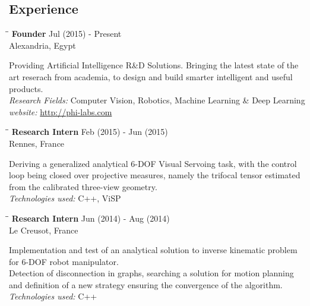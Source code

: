 \documentclass{res}
\begin{document}
\begin{resume}
\section{Experience}
   \vspace{-0.1in}
   \begin{tabbing}
   \hspace{2.7in}\= \hspace{1.8in}\= \kill %
   {\bf Founder}\> \hfill Jul (2015) - Present\\
                                    \>Alexandria, Egypt
   \end{tabbing}\vspace{-20pt}      %
    Providing Artificial Intelligence R\&D Solutions. Bringing the latest state of the art reserach from academia, to design and build smarter intelligent and useful products.\\
    {\sl Research Fields:}  Computer Vision, Robotics, Machine Learning \& Deep Learning\\
    {\sl website:} \url{http://phi-labs.com}

   \begin{tabbing}
   \hspace{2.7in}\= \hspace{1.8in}\= \kill %
   {\bf Research Intern}\> \hfill Feb (2015) - Jun (2015)\\
                                    \>Rennes, France
   \end{tabbing}\vspace{-20pt}      %
    Deriving a generalized analytical 6-DOF Visual Servoing task, with the control loop being closed over projective measures, namely the trifocal tensor estimated from the calibrated three-view geometry. \\
    {\sl Technologies used:}  C++, ViSP

   \begin{tabbing}
   \hspace{2.7in}\= \hspace{1.8in}\= \kill %
   {\bf Research Intern}\> \hfill Jun (2014) - Aug (2014)\\
                                    \>Le Creusot, France
   \end{tabbing}\vspace{-20pt}      %
    Implementation and test of an analytical solution to inverse kinematic problem for 6-DOF robot manipulator.\\
    Detection of disconnection in graphs, searching a solution for motion planning and definition of a new strategy ensuring the convergence of the algorithm.\\
    {\sl Technologies used:}  C++


\end{resume}
\end{document}
